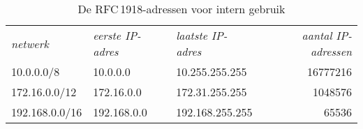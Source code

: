 \begin{table}[htp]
   \centering
   \begin{tabular}{lllr}
   \textit{netwerk}  & \textit{eerste IP-adres} & \textit{laatste IP-adres} & \textit{aantal IP-adressen}\\[1ex]
   10.0.0.0/8        & 10.0.0.0                 & 10.255.255.255            & \num{16777216} \\
   172.16.0.0/12     & 172.16.0.0               & 172.31.255.255            & \num{1048576}  \\
   192.168.0.0/16    & 192.168.0.0              & 192.168.255.255           & \num{65536}    \\
   \end{tabular}
   \caption{De RFC\,1918-adressen voor intern gebruik}
   \label{tab:rfc1918}
\end{table}


